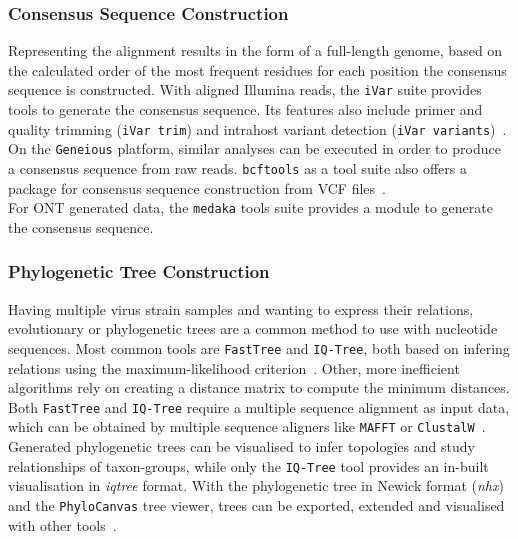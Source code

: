 \subsubsection*{Consensus Sequence Construction}
Representing the alignment results in the form of a full-length genome, based on the calculated order of the most frequent residues for each position the consensus sequence is constructed. With aligned Illumina reads, the \texttt{iVar} suite provides tools to generate the consensus sequence. Its features also include primer and quality trimming (\texttt{iVar trim}) and intrahost variant detection (\texttt{iVar variants})~\cite{grubaugh2019amplicon}. On the \texttt{Geneious} platform, similar analyses can be executed in order to produce a consensus sequence from raw reads\cite{kearse2012geneious}. \texttt{bcftools} as a tool suite also offers a package for consensus sequence construction from \ac{VCF} files~\cite{li2009sequence}.\\
For \ac{ONT} generated data, the \texttt{medaka} tools suite provides a module to generate the consensus sequence. 

\subsubsection*{Phylogenetic Tree Construction}
Having multiple virus strain samples and wanting to express their relations, evolutionary or phylogenetic trees are a common method to use with nucleotide sequences. Most common tools are \texttt{FastTree} and \texttt{IQ-Tree}, both based on infering relations using the maximum-likelihood criterion~\cite{price2009fasttree, minh2020iq}. Other, more inefficient algorithms rely on creating a distance matrix to compute the minimum distances. Both \texttt{FastTree} and \texttt{IQ-Tree} require a multiple sequence alignment as input data, which can be obtained by multiple sequence aligners like \texttt{MAFFT} or \texttt{ClustalW}~\cite{katoh2013mafft, thompson2003multiple}. Generated phylogenetic trees can be visualised to infer topologies and study relationships of taxon-groups, while only the \texttt{IQ-Tree} tool provides an in-built visualisation in \textit{iqtree} format. With the phylogenetic tree in Newick format (\textit{nhx}) and the \texttt{PhyloCanvas} tree viewer, trees can be exported, extended and visualised with other tools~\cite{abudahab2021phylocanvas}.

